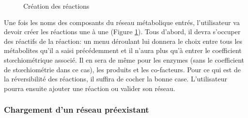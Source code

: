 \begin{figure}[!ht]
	\begin{center}
		\caption{Création des réactions}
  		\label{reactions}
  	\end{center}	
\end{figure}

Une fois les noms des composants du réseau métabolique entrés, l'utilisateur va devoir créer les réactions une à une (Figure \ref{reactions}). Tous d'abord, il devra s'occuper des réactifs de la réaction: un menu déroulant lui donnera le choix entre tous les métabolites qu'il a saisi précédemment et il n'aura plus qu'à entrer le coefficient stœchiométrique associé. Il en sera de même pour les enzymes (sans le coefficient de stœchiométrie dans ce cas), les produits et les co-facteurs. Pour ce qui est de la réversibilité des réactions, il suffira de cocher la bonne case. L'utilisateur pourra ensuite ajouter une réaction ou valider son réseau. 

\pagebreak

\subsubsection{Chargement d'un réseau préexistant}

